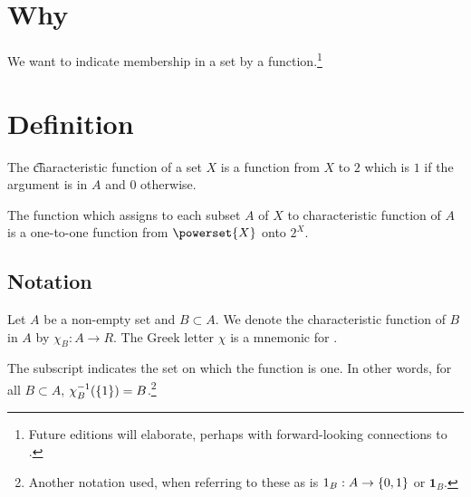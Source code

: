 

\section*{Why}

We want to indicate membership in a set by a function.\footnote{Future editions will elaborate, perhaps with forward-looking connections to .}

\section*{Definition}

The \t{characteristic function} of a set $X$ is a function from $X$ to $2$ which is $1$ if the argument is in $A$ and 0 otherwise.

The function which assigns to each subset $A$ of $X$ to characteristic function of $A$ is a one-to-one function from $\powerset{X}$ onto $2^{X}$.

\subsection*{Notation}

Let $A$ be a non-empty set and $B \subset A$.
We denote the characteristic function of $B$ in $A$ by $\chi _{B}: A \to R$.
The Greek letter $\chi $ is a mnemonic for .

The subscript indicates the set on which the function is one.
In other words, for all $B \subset A$, $\chi _{B}^{-1}(\{1\}) = B$.\footnote{Another notation used, when referring to these as  is $1_{B}: A \to \{0, 1\}$ or $\mathbf{1}_B$.}

\blankpage